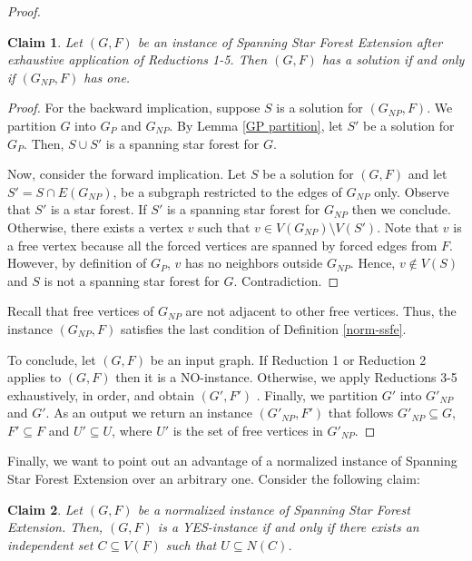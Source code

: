 \documentclass[en]{pracamgr}
\newtheorem{claim}{Claim}
\theoremstyle{definition}
\newcommand{\ssf}{spanning star forest}
\newcommand{\ssfep}{{\sc Spanning Star Forest Extension}}
\begin{document}
\begin{proof}
	\begin{claim}\label{GNP partition}
		Let $(G,F)$ be an instance of \ssfep{} after exhaustive application of Reductions 1-5. Then $(G,F)$ has a solution if and only if $(G_{NP},F)$ has one.
	\end{claim}

	\begin{proof}
		For the backward implication, suppose $S$ is a solution for $(G_{NP},F)$. We  partition $G$ into $G_P$ and $G_{NP}$. By Lemma \ref{GP partition}, let $S'$ be a solution for $G_P$. Then, $S \cup S'$ is a \ssf{} for $G$.
		
		Now, consider the forward implication. Let $S$ be a solution for $(G, F)$ and let $S' = S \cap E(G_{NP})$, be a subgraph restricted to the edges of $G_{NP}$ only. Observe that $S'$ is a star forest. If $S'$ is a spanning star forest for $G_{NP}$ then we conclude. Otherwise, there exists a vertex $v$ such that $v \in V(G_{NP}) \setminus V(S')$. Note that $v$ is a free vertex because all the forced vertices are spanned by forced edges from $F$. However, by definition of $G_P$, $v$ has no neighbors outside $G_{NP}$. Hence, $v \notin V(S)$ and $S$ is not a spanning star forest for $G$. Contradiction.
	\end{proof}

	Recall that free vertices of $G_{NP}$ are not adjacent to other free vertices. Thus, the instance $(G_{NP},F)$ satisfies the last condition of Definition \ref{norm-ssfe}.

	To conclude, let $(G,F)$ be an input graph. If Reduction 1 or Reduction 2 applies to $(G,F)$ then it is a NO-instance. Otherwise, we apply Reductions 3-5 exhaustively, in order, and obtain $(G',F')$ . Finally, we partition $G'$ into $G'_{NP}$ and $G'$. As an output we return an instance $(G'_{NP},F')$ that follows $G'_{NP} \subseteq G$, $F' \subseteq F$ and $U' \subseteq U$, where $U'$ is the set of free vertices in $G'_{NP}$. \qedhere

\end{proof}

Finally, we want to point out an advantage of a normalized instance of \ssfep{} over an arbitrary one. Consider the following claim:

\begin{claim}\label{span-lemma}
	Let $(G,F)$ be a normalized instance of \ssfep{}. Then, $(G,F)$ is a YES-instance if and only if there exists an independent set $C \subseteq V(F)$ such that $U \subseteq N(C)$.
\end{claim}
\end{document}
